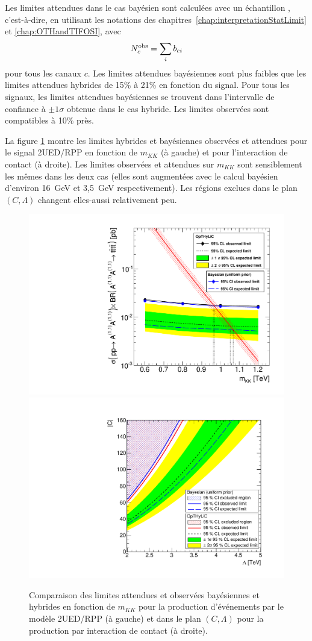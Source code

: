 \clearpage
Les limites attendues dans le cas bay\'esien sont calcul\'ees avec un \'echantillon , c'est-\`a-dire, en utilisant les notations des chapitres~\ref{chap:interpretationStatLimit} et \ref{chap:OTHandTIFOSI}, avec
\[N^{\text{obs}}_c=\sum\limits_i b_{ci}\]
pour tous les canaux $c$. Les limites attendues bay\'esiennes sont plus faibles que les limites attendues hybrides de 15\% \`a 21\% en fonction du signal. 
Pour tous les signaux, les limites attendues bay\'esiennes se trouvent dans l'intervalle de confiance \`a $\pm 1\sigma$ obtenue dans le cas hybride. 
Les limites observ\'ees sont compatibles \`a 10\% pr\`es.



La figure \ref{fig:ExclusionPlot_RPPFullStatAndCI_OTHVsBayesian} montre les limites hybrides et bayésiennes observ\'ees et attendues pour le signal 2UED/RPP en fonction de $m_{KK}$ (\`a gauche) et pour l'interaction de contact (\`a droite). Les limites observ\'ees et attendues sur $m_{KK}$ sont sensiblement les m\^emes dans les deux cas (elles sont augment\'ees avec le calcul bay\'esien d'environ 16~GeV et 3,5~GeV respectivement). Les r\'egions exclues dans le plan $\left(C,\Lambda\right)$ changent elles-aussi relativement peu. 

\begin{figure}[!htb]
\begin{center}
\includegraphics[width=0.45\linewidth]{macros/ExclusionPlot_RPPFullStat_OTHVsBayesian.pdf}
\includegraphics[width=0.47\linewidth]{macros/CVsLambdaForContactInteractionHybridVsBayesian.pdf}
\end{center}
\caption{Comparaison des limites attendues et observ\'ees bay\'esiennes et hybrides en fonction de $m_{KK}$ pour la production d'\'ev\'enements \fourtop{} par le mod\`ele 2UED/RPP (\`a gauche) et dans le plan $\left(C,\Lambda\right)$ pour la production par interaction de contact (\`a droite).\label{fig:ExclusionPlot_RPPFullStatAndCI_OTHVsBayesian}}
\end{figure}

